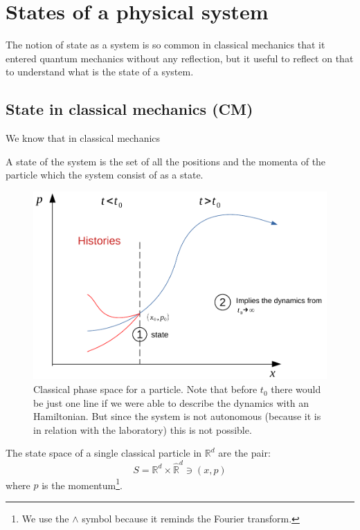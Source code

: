 \documentclass[../main.tex]{subfiles}
\begin{document}
\section{States of a physical system}
The notion of state as a system is so common in classical mechanics that it entered quantum mechanics without any reflection, but it useful to reflect on that to understand what is the state of a system.
\subsection[State in Classic Mechanics]{State in classical mechanics (CM)}
We know that in classical mechanics
\begin{definition}
A state of the system is the set of all the positions and the momenta of the particle which the system consist of as a state.
\end{definition}
\begin{figure}[H]
	\includegraphics[width=1\textwidth]{images/spazio_fasi_classico.pdf}
	\caption[Classical phase space]{Classical phase space for a particle. Note that before $t_0$ there would be just one line if we were able to describe the dynamics with an Hamiltonian. But since the system is not autonomous (because it is in relation with the laboratory) this is not possible.}
\end{figure}
\begin{example}
The state space of a single classical particle in $\mathbb{R}^d$ are the pair:
\[
S=\mathbb{R}^d\times \hat{\mathbb{R}}^d \ni \left(x,p\right)
\]
where $p$ is the momentum\footnote{We use the $\wedge$ symbol because it reminds the Fourier transform.}.
\end{example}
\end{document}
